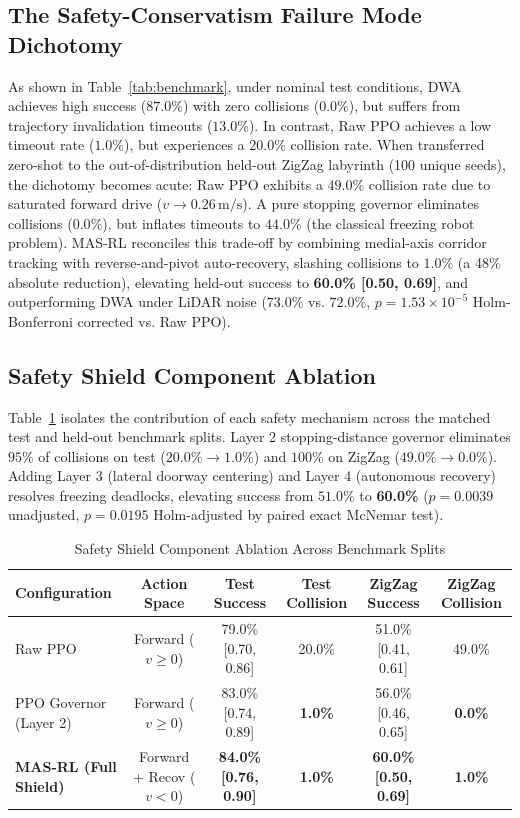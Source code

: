 \documentclass[runningheads]{llncs}
\begin{document}
\subsection{The Safety-Conservatism Failure Mode Dichotomy}
As shown in Table~\ref{tab:benchmark}, under nominal test conditions, DWA achieves high success ($87.0\%$) with zero collisions ($0.0\%$), but suffers from trajectory invalidation timeouts ($13.0\%$). In contrast, Raw PPO achieves a low timeout rate ($1.0\%$), but experiences a $20.0\%$ collision rate. When transferred zero-shot to the out-of-distribution held-out ZigZag labyrinth (100 unique seeds), the dichotomy becomes acute: Raw PPO exhibits a $49.0\%$ collision rate due to saturated forward drive ($v \to 0.26\,\text{m/s}$). A pure stopping governor eliminates collisions ($0.0\%$), but inflates timeouts to $44.0\%$ (the classical freezing robot problem). MAS-RL reconciles this trade-off by combining medial-axis corridor tracking with reverse-and-pivot auto-recovery, slashing collisions to $1.0\%$ (a 48\% absolute reduction), elevating held-out success to \textbf{60.0\% [0.50, 0.69]}, and outperforming DWA under LiDAR noise ($73.0\%$ vs. $72.0\%$, $p = 1.53 \times 10^{-5}$ Holm-Bonferroni corrected vs. Raw PPO).

\subsection{Safety Shield Component Ablation}
Table~\ref{tab:ablation} isolates the contribution of each safety mechanism across the matched test and held-out benchmark splits. Layer 2 stopping-distance governor eliminates $95\%$ of collisions on test ($20.0\% \to 1.0\%$) and $100\%$ on ZigZag ($49.0\% \to 0.0\%$). Adding Layer 3 (lateral doorway centering) and Layer 4 (autonomous recovery) resolves freezing deadlocks, elevating success from $51.0\%$ to \textbf{60.0\%} ($p = 0.0039$ unadjusted, $p = 0.0195$ Holm-adjusted by paired exact McNemar test).

\begin{table}[h]
\centering
\caption{Safety Shield Component Ablation Across Benchmark Splits}
\label{tab:ablation}
\scriptsize
\begin{tabular}{lccccc}
\toprule
\textbf{Configuration} & \textbf{Action Space} & \textbf{Test Success} & \textbf{Test Collision} & \textbf{ZigZag Success} & \textbf{ZigZag Collision} \\
\midrule
Raw PPO & Forward ($v \ge 0$) & 79.0\% [0.70, 0.86] & 20.0\% & 51.0\% [0.41, 0.61] & 49.0\% \\
PPO Governor (Layer 2) & Forward ($v \ge 0$) & 83.0\% [0.74, 0.89] & \textbf{1.0\%} & 56.0\% [0.46, 0.65] & \textbf{0.0\%} \\
\textbf{MAS-RL (Full Shield)} & Forward + Recov ($v < 0$) & \textbf{84.0\% [0.76, 0.90]} & \textbf{1.0\%} & \textbf{60.0\% [0.50, 0.69]} & \textbf{1.0\%} \\
\bottomrule
\end{tabular}
\end{table}
\end{document}
